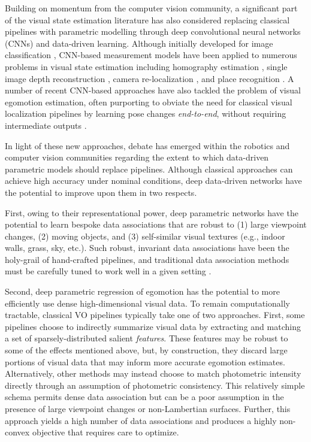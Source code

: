 Building on momentum from the computer vision community, a significant part of the visual state estimation literature has also considered replacing classical pipelines with parametric modelling through deep convolutional neural networks (CNNs) and data-driven learning. Although initially developed for image classification \citep{LeCun2015-qf}, CNN-based measurement models have been applied to numerous problems in visual state estimation including homography estimation \citep{DeTone2016-ue}, single image depth reconstruction \citep{Garg2016-ip},  camera re-localization \citep{Kendall2016-zf}, and place recognition \citep{Sunderhauf2015-is}. A number of recent CNN-based approaches have also tackled the problem of visual egomotion estimation, often purporting to obviate the need for classical visual localization pipelines by learning pose changes \textit{end-to-end}, without requiring intermediate outputs \citep{Melekhov2017-dl, Handa2016-hm, Oliveira2017-lt}.

In light of these new approaches, debate has emerged within the robotics and computer vision communities regarding the extent to which data-driven parametric models should replace pipelines. Although classical approaches can achieve high accuracy under nominal conditions, deep data-driven networks have the potential to improve upon them in two respects.

First, owing to their representational power, deep parametric networks have the potential to learn bespoke data associations that are robust to (1) large viewpoint changes, (2) moving objects, and (3) self-similar visual textures (e.g., indoor walls, grass, sky, etc.). Such robust, invariant data associations have been the holy-grail of hand-crafted pipelines, and traditional data association methods must be carefully tuned to work well in a given setting \citep{schonberger_comparative_2017}.

Second, deep parametric regression of egomotion has the potential to more efficiently use dense high-dimensional visual data. To remain computationally tractable, classical VO pipelines typically take one of two approaches.  First, some pipelines \citep{Leutenegger2015-fk,Cvisic2015-mt} choose to indirectly summarize visual data by extracting and matching a set of sparsely-distributed salient \textit{features}. These features may be robust to some of the effects mentioned above, but, by construction, they discard large portions of visual data that may inform more accurate egomotion estimates. Alternatively, other methods \citep{forster2014svo, wang_stereo_2017,  engel_direct_2018} may instead choose to match photometric intensity directly through an assumption of photometric consistency. This relatively simple schema permits dense data association but can be a poor assumption in the presence of large viewpoint changes or non-Lambertian surfaces. Further, this approach yields a high number of data associations and produces a highly non-convex objective that requires care to optimize. 

